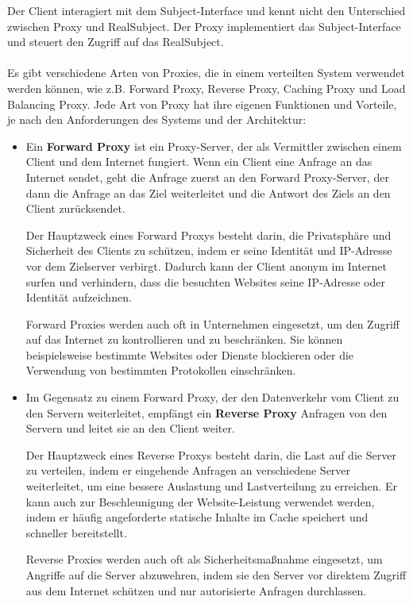 Der Client interagiert mit dem Subject-Interface und kennt nicht den Unterschied zwischen Proxy und RealSubject. Der Proxy implementiert das Subject-Interface und steuert den Zugriff auf das RealSubject.
\\\\
Es gibt verschiedene Arten von Proxies, die in einem verteilten System verwendet werden können, wie z.B. Forward Proxy, Reverse Proxy, Caching Proxy und Load Balancing Proxy. Jede Art von Proxy hat ihre eigenen Funktionen und Vorteile, je nach den Anforderungen des Systems und der Architektur:

\begin{itemize}
\item Ein \textbf{Forward Proxy} ist ein Proxy-Server, der als Vermittler zwischen einem Client und dem Internet fungiert. Wenn ein Client eine Anfrage an das Internet sendet, geht die Anfrage zuerst an den Forward Proxy-Server, der dann die Anfrage an das Ziel weiterleitet und die Antwort des Ziels an den Client zurücksendet.

Der Hauptzweck eines Forward Proxys besteht darin, die Privatsphäre und Sicherheit des Clients zu schützen, indem er seine Identität und IP-Adresse vor dem Zielserver verbirgt. Dadurch kann der Client anonym im Internet surfen und verhindern, dass die besuchten Websites seine IP-Adresse oder Identität aufzeichnen.

Forward Proxies werden auch oft in Unternehmen eingesetzt, um den Zugriff auf das Internet zu kontrollieren und zu beschränken. Sie können beispielsweise bestimmte Websites oder Dienste blockieren oder die Verwendung von bestimmten Protokollen einschränken.
\item Im Gegensatz zu einem Forward Proxy, der den Datenverkehr vom Client zu den Servern weiterleitet, empfängt ein \textbf{Reverse Proxy} Anfragen von den Servern und leitet sie an den Client weiter.

Der Hauptzweck eines Reverse Proxys besteht darin, die Last auf die Server zu verteilen, indem er eingehende Anfragen an verschiedene Server weiterleitet, um eine bessere Auslastung und Lastverteilung zu erreichen. Er kann auch zur Beschleunigung der Website-Leistung verwendet werden, indem er häufig angeforderte statische Inhalte im Cache speichert und schneller bereitstellt.

Reverse Proxies werden auch oft als Sicherheitsmaßnahme eingesetzt, um Angriffe auf die Server abzuwehren, indem sie den Server vor direktem Zugriff aus dem Internet schützen und nur autorisierte Anfragen durchlassen.


\end{itemize}
